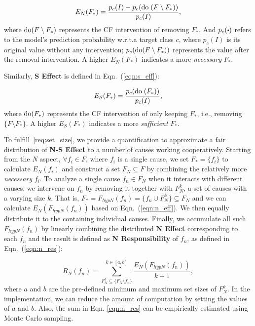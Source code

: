 \begin{equation}\label{eqn:n_eff}
   E_N(F_*) = \frac{p_{c}(I)-p_{c}({\rm do} \; (F \setminus F_*))} {p_{c}(I)},
\end{equation}
where ${\rm do}(F \setminus F_*)$ represents the CF intervention of removing $F_*$.
And $p_{c}(\bigcdot)$ refers to the model's prediction probability w.r.t.\;a target class $c$, where $p_{c}(I)$ is its original value without any intervention; $p_{c}({\rm do}(F \setminus F_*))$ represents the value after the removal intervention.
A higher $E_{N}(F_*)$ indicates a more \textit{necessary} $F_*$.

Similarly, \textbf{S Effect} is defined in Eqn.~(\ref{eqn:s_eff}):

\begin{equation}\label{eqn:s_eff}
   E_S(F_*) = \frac{p_{c}({\rm do}\; (F_*))} {p_{c}(I)},
\end{equation}
where ${\rm do}(F_*)$ represents the CF intervention of only keeping $F_*$, i.e., removing $\{F \setminus F_*\}$.
A higher $E_{S}(F_*)$ indicates a more \textit{sufficient} $F_*$.

To fulfill~\ref{req:set_size}, we provide a quantification to approximate a fair distribution of \textbf{N-S Effect} to a number of causes working cooperatively.
Starting from the \textit{N} aspect,  $\forall f_i \in F$, where $f_i$ is a single cause, we set $F_* = \{f_i\}$ to calculate $E_N(f_i)$ and construct a set $F_N \subseteq F$ by combining the relatively more \textit{necessary} $f_i$.
To analyze a single cause $f_n \in F_N$ when it interacts with different causes, we intervene on $f_n$ by removing it together with $F_{N}^k$, a set of causes with a varying size $k$.
That is, $F_*=F_{hypN}(f_n)=\{f_n \cup F_{N}^k\} \subseteq F_N$ and we can calculate $E_N(F_{hypN}(f_n))$ based on Eqn.~(\ref{eqn:n_eff}).
We then equally distribute it to the containing individual causes.
Finally, we accumulate all such $F_{hypN}(f_n)$ by linearly combining the distributed \textbf{N Effect} corresponding to each $f_n$ and the result is defined as \textbf{N Responsibility} of $f_n$, as defined in Eqn.~(\ref{eqn:n_res}):

\begin{equation}\label{eqn:n_res}
   R_N(f_n) = \sum_{F_N^k\subseteq \{F_N \setminus f_n\}}^{k \in [a,b] }  \frac{E_N(F_{hypN}(f_n))} {k+1},
\end{equation}
where $a$ and $b$ are the pre-defined minimum and maximum set sizes of $F_N^k$. 
In the implementation, we can reduce the amount of computation by setting the values of $a$ and $b$. Also, the sum in Eqn. \ref{eqn:n_res} can be empirically estimated using Monte Carlo sampling.

